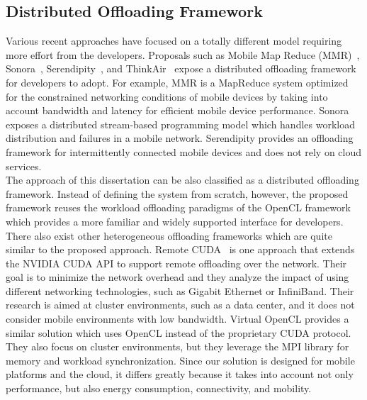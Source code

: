\subsection{Distributed Offloading Framework}
\label{intro:framework}
%
Various recent approaches have focused on a totally different model
requiring more effort from the developers.
%
Proposals such as Mobile Map Reduce (MMR)~\cite{mmr},
Sonora~\cite{sonora}, Serendipity~\cite{serendipity}, and
ThinkAir~\cite{thinkair} expose a distributed offloading framework for
developers to adopt.
%
For example, MMR is a MapReduce system optimized for the constrained
networking conditions of mobile devices by taking into account
bandwidth and latency for efficient mobile device performance.
%
Sonora exposes a distributed stream-based programming model which
handles workload distribution and failures in a mobile network.
%
Serendipity provides an offloading framework for intermittently
connected mobile devices and does not rely on cloud services.\\
%
The approach of this dissertation can be also classified as a distributed offloading
framework.
%
Instead of defining the system from scratch, however, the proposed
framework reuses the workload offloading paradigms of the OpenCL
framework which provides a more familiar and widely supported interface
for developers.
%
There also exist other heterogeneous offloading frameworks which are
quite similar to the proposed approach.
%
Remote CUDA~\cite{rcuda} is one approach that extends the NVIDIA CUDA
API to support remote offloading over the network.
%
Their goal is to minimize the network overhead and they analyze the
impact of using different networking technologies, such as Gigabit
Ethernet or InfiniBand.
%
Their research is aimed at cluster environments, such as a data center,
and it does not consider mobile environments with low bandwidth.
%
Virtual OpenCL\cite{vocl} provides a similar solution which uses
OpenCL instead of the proprietary CUDA protocol.
%
They also focus on cluster environments, but they leverage the MPI
library for memory and workload synchronization.
%
Since our solution is designed for mobile platforms and the cloud, it
differs greatly because it takes into account not only performance, but
also energy consumption, connectivity, and mobility.
%
